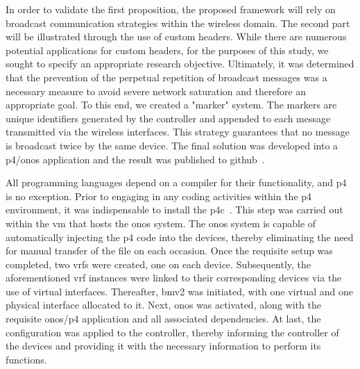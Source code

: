 In order to validate the first proposition, the proposed framework will rely on broadcast communication strategies within the wireless domain. The second part will be illustrated through the use of custom headers. While there are numerous potential applications for custom headers, for the purposes of this study, we sought to specify an appropriate research objective. Ultimately, it was determined that the prevention of the perpetual repetition of broadcast messages was a necessary measure to avoid severe network saturation and therefore an appropriate goal. 
To this end, we created a "marker" system. The markers are unique identifiers generated by the controller and appended to each message transmitted via the wireless interfaces. This strategy guarantees that no message is broadcast twice by the same device. The final solution was developed into a \gls{p4}/\gls{onos} application and the result was published to github~\cite{noauthor_baco-66onos-apps_nodate}.

All programming languages depend on a compiler for their functionality, and \gls{p4} is no exception. Prior to engaging in any coding activities within the \gls{p4} environment, it was indispensable to install the p4c~\cite{noauthor_p4langp4c_nodate}. This step was carried out within the \gls{vm} that hosts the \gls{onos} system. The \gls{onos} system is capable of automatically injecting the \gls{p4} code into the devices, thereby eliminating the need for manual transfer of the file on each occasion.
Once the requisite setup was completed, two \glspl{vrf} were created, one on each device. Subsequently, the aforementioned \gls{vrf} instances were linked to their corresponding devices via the use of virtual interfaces. Thereafter, \gls{bmv2} was initiated, with one virtual and one physical interface allocated to it. Next, \gls{onos} was activated, along with the requisite \gls{onos}/\gls{p4} application and all associated dependencies. At last, the configuration was applied to the controller, thereby informing the controller of the devices and providing it with the necessary information to perform its functions.

